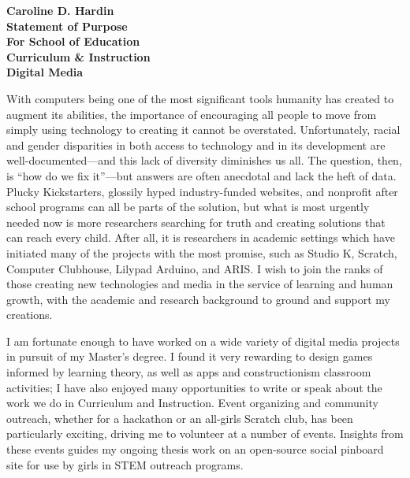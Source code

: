 \documentclass[10pt]{letter}
\begin{document}
\begin{letter}

\noindent 
\large\textbf{Caroline D. Hardin\\
Statement of Purpose\\
For School of Education\\
Curriculum \& Instruction\\
Digital Media
}
\vspace{1in}
\signature{Caroline D. Hardin} %

With computers being one of the most significant tools humanity has created to augment its abilities, the importance of encouraging all people to move from simply using technology to creating it cannot be overstated. Unfortunately, racial and gender disparities in both access to technology and in its development are well-documented---and this lack of diversity diminishes us all. The question, then, is ``how do we fix it''---but answers are often anecdotal and lack the heft of data. Plucky Kickstarters, glossily hyped industry-funded websites, and nonprofit after school programs can all be parts of the solution, but what is most urgently needed now is more researchers searching for truth and creating solutions that can reach every child. After all, it is researchers in academic settings which have initiated many of the projects with the most promise, such as Studio K, Scratch, Computer Clubhouse, Lilypad Arduino, and ARIS. I wish to join the ranks of those creating new technologies and media in the service of learning and human growth, with the academic and research background to ground and support my creations.

I am fortunate enough to have worked on a wide variety of digital media projects in pursuit of my Master's degree. I found it very rewarding to design games informed by learning theory, as well as apps and constructionism classroom activities; I have also enjoyed many opportunities to write or speak about the work we do in Curriculum and Instruction. Event organizing and community outreach, whether for a hackathon or an all-girls Scratch club, has been particularly exciting, driving me to volunteer at a number of events. Insights from these events guides my ongoing thesis work on an open-source social pinboard site for use by girls in STEM outreach programs.


\end{letter}
\end{document}
